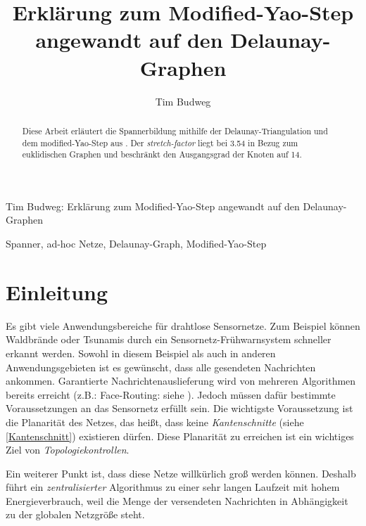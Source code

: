 \documentclass[a4paper,twoside]{IEEEtran}
\newcommand{\seminarteilnehmer}{Tim Budweg}
\newcommand{\seminartitel}{Erklärung zum Modified-Yao-Step angewandt auf den Delaunay-Graphen}
\begin{document}
\title{\seminartitel}
\author{\seminarteilnehmer}

%
{\seminarteilnehmer: \seminartitel}


\maketitle

\begin{abstract}
\space Diese Arbeit erläutert die Spannerbildung mithilfe der Delaunay-Triangulation und dem modified-Yao-Step aus \cite{kanj}. Der \emph{stretch-factor} liegt bei 3.54 in Bezug zum euklidischen Graphen und beschränkt den Ausgangsgrad der Knoten auf 14.
\end{abstract}

\begin{IEEEkeywords}
\space Spanner, ad-hoc Netze, Delaunay-Graph, Modified-Yao-Step
\end{IEEEkeywords}


\section{Einleitung}
Es gibt viele Anwendungsbereiche für drahtlose Sensornetze. 
Zum Beispiel können Waldbrände oder Tsunamis durch ein Sensornetz-Frühwarnsystem schneller erkannt werden. 
Sowohl in diesem Beispiel als auch in anderen Anwendungsgebieten ist es gewünscht, dass alle gesendeten Nachrichten ankommen.
Garantierte Nachrichtenauslieferung wird von mehreren Algorithmen bereits erreicht (z.B.: Face-Routing: siehe \cite{FaceRouting}).
Jedoch müssen dafür bestimmte Voraussetzungen an das Sensornetz erfüllt sein. 
Die wichtigste Voraussetzung ist die Planarität des Netzes, das heißt, dass keine \emph{Kantenschnitte} (siehe \ref{Kantenschnitt}) existieren dürfen. 
Diese Planarität zu erreichen ist ein wichtiges Ziel von \emph{Topologiekontrollen}.

Ein weiterer Punkt ist, dass diese Netze willkürlich groß werden können.
Deshalb führt ein \emph{zentralisierter} Algorithmus zu einer sehr langen Laufzeit mit hohem Energieverbrauch, weil die Menge der versendeten Nachrichten in Abhängigkeit zu der globalen Netzgröße steht.
\end{document}

